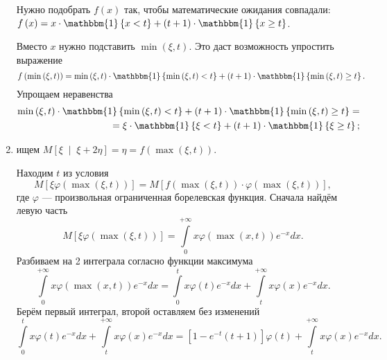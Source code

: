 \begin{enumerate}[label=\alph*)]
  Нужно подобрать $f \left( x \right) $ так, чтобы математические ожидания совпадали:
  $f \left( x \right) =
    x \cdot \mathbbm{1} \left\{ x < t \right\} +
    \left( t + 1 \right) \cdot \mathbbm{1} \left\{ x \geq t \right\} $.

  Вместо $x$ нужно подставить $ \min \left( \xi, t \right) $.
  Это даст возможность упростить выражение
  $$f \left( \min \left( \xi, t \right) \right) =
    \min \left( \xi, t \right) \cdot \mathbbm{1} \left\{ \min \left( \xi, t \right) < t \right\} +
    \left( t + 1 \right) \cdot \mathbbm{1} \left\{ \min \left( \xi, t \right) \geq t \right\}.$$
  Упрощаем неравенства
  \begin{equation*}
    \begin{split}
      \min \left( \xi, t \right) \cdot \mathbbm{1} \left\{ \min \left( \xi, t \right) < t \right\} +
      \left( t + 1 \right) \cdot \mathbbm{1} \left\{ \min \left( \xi, t \right) \geq t \right\} = \\
      = \xi \cdot \mathbbm{1} \left\{ \xi < t \right\} +
      \left( t + 1 \right) \cdot \mathbbm{1} \left\{ \xi \geq t \right\};
    \end{split}
  \end{equation*}
  \item ищем
  $M \left[ \xi \; \middle| \; \xi + 2 \eta \right] =
    \eta =
    f \left( \max \left( \xi, t \right) \right) $.

  Находим $t$ из условия
  $$M \left[ \xi \varphi \left( \max \left( \xi, t \right) \right) \right] =
    M \left[
      f \left( \max \left( \xi, t \right) \right) \cdot
      \varphi \left( \max \left( \xi, t \right) \right)
    \right],$$
  где $ \varphi $ --- произвольная ограниченная борелевская функция.
  Сначала найдём левую часть
  $$M \left[ \xi \varphi \left( \max \left( \xi, t \right) \right) \right] =
    \int \limits_0^{+ \infty } x \varphi \left( \max \left( x, t \right) \right) e^{-x} dx.$$
  Разбиваем на 2 интеграла согласно функции максимума
  $$ \int \limits_0^{+ \infty } x \varphi \left( \max \left( x, t \right) \right) e^{-x} dx =
    \int \limits_0^t x \varphi \left( t \right) e^{-x} dx +
    \int \limits_t^{+ \infty } x \varphi \left( x \right) e^{-x} dx.$$
  Берём первый интеграл, второй оставляем без изменений
  $$ \int \limits_0^t x \varphi \left( t \right) e^{-x} dx +
    \int \limits_t^{+ \infty } x \varphi \left( x \right) e^{-x} dx =
    \left[ 1 - e^{-t} \left( t + 1 \right) \right] \varphi \left( t \right) +
    \int \limits_t^{+ \infty } x \varphi \left( x \right) e^{-x} dx.$$


\end{enumerate}
